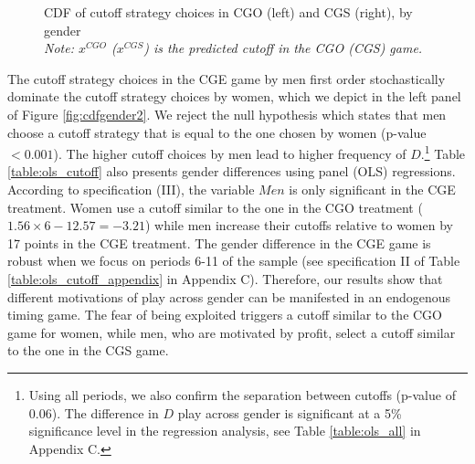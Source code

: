 \documentclass[12pt, letterpaper]{article}
\theoremstyle{plain}
\begin{document}
\begin{center}
\begin{figure}[ht]
\begin{minipage}[t]{0.45\columnwidth}
%
\end{minipage} 
\caption{CDF of cutoff strategy choices in CGO (left) and CGS (right), by gender \\\footnotesize{\textit{Note: $x^{CGO}$ ($x^{CGS}$) is the predicted cutoff in the CGO (CGS) game.}} }
\label{fig:cdfgender1}\end{figure}
\par\end{center}

The cutoff strategy choices in the CGE game by men first order stochastically dominate the cutoff strategy choices by women, which we depict in the left panel of Figure \ref{fig:cdfgender2}. We reject the null hypothesis which states that men choose a cutoff strategy that is equal to the one chosen by women (p-value $<0.001$). The higher cutoff choices by men lead to higher frequency of $D$.\footnote{Using all periods, we also confirm the separation between cutoffs (p-value of 0.06). The difference in $D$ play across gender is significant at a 5\% significance level in the regression analysis, see Table \ref{table:ols_all} in Appendix C.} Table \ref{table:ols_cutoff} also presents gender differences using panel (OLS) regressions. According to specification (III), the variable $Men$ is only significant in the CGE treatment. Women use a cutoff similar to the one in the CGO treatment ($1.56\times 6-12.57= -3.21$) while men increase their cutoffs relative to women by 17 points in the CGE treatment. The gender difference in the CGE game is robust when we focus on periods 6-11 of the sample (see specification II of Table \ref{table:ols_cutoff_appendix} in Appendix C). Therefore, our results show that different motivations of play across gender can be manifested in an endogenous timing game. The fear of being exploited triggers a cutoff similar to the CGO game for women, while men, who are motivated by profit, select a cutoff similar to the one in the CGS game. 
\end{document}
